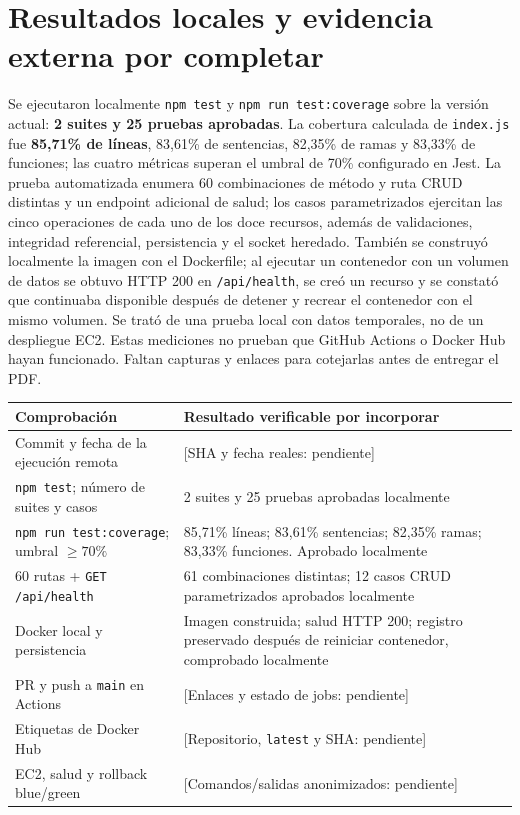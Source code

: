 \documentclass[12pt,a4paper]{article}
\begin{document}
\section{Resultados locales y evidencia externa por completar}
Se ejecutaron localmente \texttt{npm test} y \texttt{npm run test:coverage} sobre la versión actual: \textbf{2 suites y 25 pruebas aprobadas}. La cobertura calculada de \texttt{index.js} fue \textbf{85,71\% de líneas}, 83,61\% de sentencias, 82,35\% de ramas y 83,33\% de funciones; las cuatro métricas superan el umbral de 70\% configurado en Jest. La prueba automatizada enumera 60 combinaciones de método y ruta CRUD distintas y un endpoint adicional de salud; los casos parametrizados ejercitan las cinco operaciones de cada uno de los doce recursos, además de validaciones, integridad referencial, persistencia y el socket heredado. También se construyó localmente la imagen con el Dockerfile; al ejecutar un contenedor con un volumen de datos se obtuvo HTTP 200 en \texttt{/api/health}, se creó un recurso y se constató que continuaba disponible después de detener y recrear el contenedor con el mismo volumen. Se trató de una prueba local con datos temporales, no de un despliegue EC2. Estas mediciones no prueban que GitHub Actions o Docker Hub hayan funcionado. Faltan capturas y enlaces para cotejarlas antes de entregar el PDF.

\begin{center}
\begin{tabular}{p{}p{}}
\toprule
\textbf{Comprobación} & \textbf{Resultado verificable por incorporar} \\
\midrule
Commit y fecha de la ejecución remota & [SHA y fecha reales: pendiente] \\
\texttt{npm test}; número de suites y casos & 2 suites y 25 pruebas aprobadas localmente \\
\texttt{npm run test:coverage}; umbral $\geq 70\%$ & 85,71\% líneas; 83,61\% sentencias; 82,35\% ramas; 83,33\% funciones. Aprobado localmente \\
60 rutas + \texttt{GET /api/health} & 61 combinaciones distintas; 12 casos CRUD parametrizados aprobados localmente \\
Docker local y persistencia & Imagen construida; salud HTTP 200; registro preservado después de reiniciar contenedor, comprobado localmente \\
PR y push a \texttt{main} en Actions & [Enlaces y estado de jobs: pendiente] \\
Etiquetas de Docker Hub & [Repositorio, \texttt{latest} y SHA: pendiente] \\
EC2, salud y rollback blue/green & [Comandos/salidas anonimizados: pendiente] \\
\bottomrule
\end{tabular}
\end{center}
\end{document}
